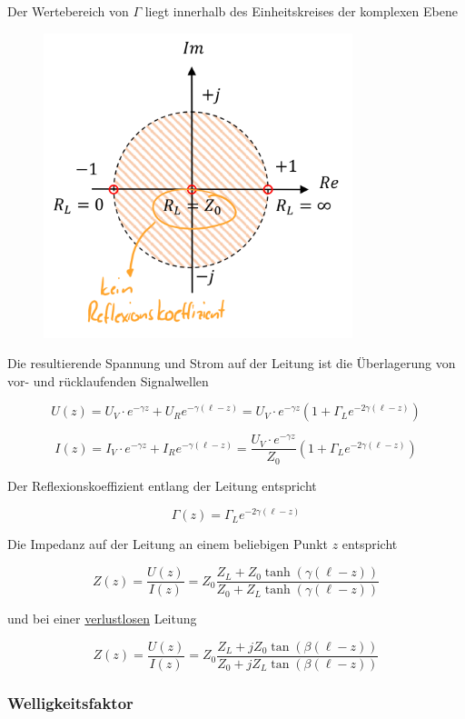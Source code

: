 \documentclass[
  10pt,
  a4paper,
  german]{article}
\numberwithin{equation}{section}
\begin{document}
Der Wertebereich von \(\Gamma\) liegt innerhalb des Einheitskreises der
komplexen Ebene

\begin{figure}[H]

{\centering \includegraphics[width=9cm,height=\textheight]{images/03_Reflexionskoeffizient.png}

}

\end{figure}

Die resultierende Spannung und Strom auf der Leitung ist die
Überlagerung von vor- und rücklaufenden Signalwellen

\[
U(z)=U_V\cdot e^{-\gamma z}+U_Re^{-\gamma(\ell-z)}=U_V\cdot e^{-\gamma z}(1+\Gamma_Le^{-2\gamma(\ell-z)})
\]

\[
I(z)=I_V\cdot e^{-\gamma z}+I_Re^{-\gamma(\ell-z)}=\frac{U_V\cdot e^{-\gamma z}}{Z_0}(1+\Gamma_Le^{-2\gamma(\ell-z)})
\]

Der Reflexionskoeffizient entlang der Leitung entspricht

\[
\Gamma(z)=\Gamma_L e^{-2\gamma(\ell-z)}
\]

Die Impedanz auf der Leitung an einem beliebigen Punkt \(z\) entspricht

\[
Z(z)=\frac{U(z)}{I(z)}=Z_0\frac{Z_L+Z_0\tanh(\gamma(\ell-z))}{Z_0+Z_L\tanh(\gamma(\ell-z))}
\]

und bei einer \ul{verlustlosen} Leitung

\[
Z(z)=\frac{U(z)}{I(z)}=Z_0\frac{Z_L+jZ_0\tan(\beta(\ell-z))}{Z_0+jZ_L\tan(\beta(\ell-z))}
\]

\hypertarget{welligkeitsfaktor}{%
\subsubsection{Welligkeitsfaktor}\label{welligkeitsfaktor}}
\end{document}
